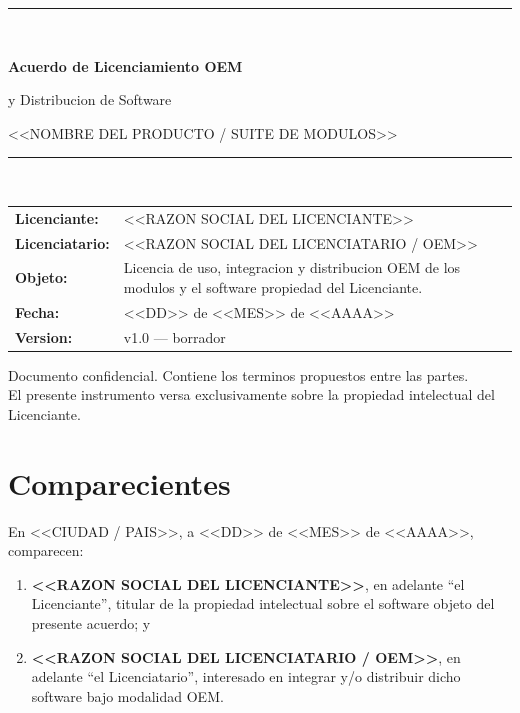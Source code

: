 \documentclass[11pt,a4paper]{article}
\newcommand{\Licenciante}{<<RAZON SOCIAL DEL LICENCIANTE>>}
\newcommand{\LicencianteAbrev}{el Licenciante}
\newcommand{\Licenciatario}{<<RAZON SOCIAL DEL LICENCIATARIO / OEM>>}
\newcommand{\LicenciatarioAbrev}{el Licenciatario}
\newcommand{\Producto}{<<NOMBRE DEL PRODUCTO / SUITE DE MODULOS>>}
\newcommand{\Jurisdiccion}{<<CIUDAD / PAIS>>}
\newcommand{\Fecha}{<<DD>> de <<MES>> de <<AAAA>>}
\newcommand{\Version}{v1.0 --- borrador}
\begin{document}
\begin{titlepage}
\centering
\vspace*{2.5cm}
{\color{acento}\rule{\textwidth}{2pt}}\\[1.2em]
{\Huge\bfseries\color{tinta} Acuerdo de Licenciamiento OEM\par}
\vspace{0.4em}
{\Large\color{tinta} y Distribucion de Software\par}
\vspace{1.0em}
{\large\color{tenue} \Producto\par}
{\color{acento}\rule{\textwidth}{2pt}}\\[3em]

\begin{tabularx}{0.85\textwidth}{@{}l X@{}}
\textbf{Licenciante:}   & \Licenciante \\[0.6em]
\textbf{Licenciatario:} & \Licenciatario \\[0.6em]
\textbf{Objeto:}        & Licencia de uso, integracion y distribucion OEM de los modulos y el software propiedad del Licenciante. \\[0.6em]
\textbf{Fecha:}         & \Fecha \\[0.6em]
\textbf{Version:}       & \Version \\
\end{tabularx}

\vfill
{\footnotesize\color{tenue}
Documento confidencial. Contiene los terminos propuestos entre las partes.\\
El presente instrumento versa exclusivamente sobre la propiedad intelectual del Licenciante.\par}
\end{titlepage}

\section*{Comparecientes}

En \Jurisdiccion, a \Fecha, comparecen:

\begin{enumerate}[label=(\alph*)]
  \item \textbf{\Licenciante}, en adelante \enquote{\LicencianteAbrev}, titular de la
        propiedad intelectual sobre el software objeto del presente acuerdo; y
  \item \textbf{\Licenciatario}, en adelante \enquote{\LicenciatarioAbrev}, interesado
        en integrar y/o distribuir dicho software bajo modalidad OEM.
\end{enumerate}
\end{document}
